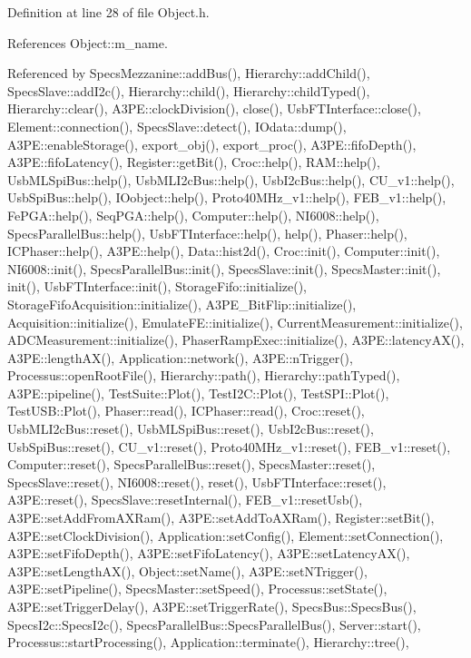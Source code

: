 Definition at line 28 of file Object.\+h.



References Object\+::m\+\_\+name.



Referenced by Specs\+Mezzanine\+::add\+Bus(), Hierarchy\+::add\+Child(), Specs\+Slave\+::add\+I2c(), Hierarchy\+::child(), Hierarchy\+::child\+Typed(), Hierarchy\+::clear(), A3\+P\+E\+::clock\+Division(), close(), Usb\+F\+T\+Interface\+::close(), Element\+::connection(), Specs\+Slave\+::detect(), I\+Odata\+::dump(), A3\+P\+E\+::enable\+Storage(), export\+\_\+obj(), export\+\_\+proc(), A3\+P\+E\+::fifo\+Depth(), A3\+P\+E\+::fifo\+Latency(), Register\+::get\+Bit(), Croc\+::help(), R\+A\+M\+::help(), Usb\+M\+L\+Spi\+Bus\+::help(), Usb\+M\+L\+I2c\+Bus\+::help(), Usb\+I2c\+Bus\+::help(), C\+U\+\_\+v1\+::help(), Usb\+Spi\+Bus\+::help(), I\+Oobject\+::help(), Proto40\+M\+Hz\+\_\+v1\+::help(), F\+E\+B\+\_\+v1\+::help(), Fe\+P\+G\+A\+::help(), Seq\+P\+G\+A\+::help(), Computer\+::help(), N\+I6008\+::help(), Specs\+Parallel\+Bus\+::help(), Usb\+F\+T\+Interface\+::help(), help(), Phaser\+::help(), I\+C\+Phaser\+::help(), A3\+P\+E\+::help(), Data\+::hist2d(), Croc\+::init(), Computer\+::init(), N\+I6008\+::init(), Specs\+Parallel\+Bus\+::init(), Specs\+Slave\+::init(), Specs\+Master\+::init(), init(), Usb\+F\+T\+Interface\+::init(), Storage\+Fifo\+::initialize(), Storage\+Fifo\+Acquisition\+::initialize(), A3\+P\+E\+\_\+\+Bit\+Flip\+::initialize(), Acquisition\+::initialize(), Emulate\+F\+E\+::initialize(), Current\+Measurement\+::initialize(), A\+D\+C\+Measurement\+::initialize(), Phaser\+Ramp\+Exec\+::initialize(), A3\+P\+E\+::latency\+A\+X(), A3\+P\+E\+::length\+A\+X(), Application\+::network(), A3\+P\+E\+::n\+Trigger(), Processus\+::open\+Root\+File(), Hierarchy\+::path(), Hierarchy\+::path\+Typed(), A3\+P\+E\+::pipeline(), Test\+Suite\+::\+Plot(), Test\+I2\+C\+::\+Plot(), Test\+S\+P\+I\+::\+Plot(), Test\+U\+S\+B\+::\+Plot(), Phaser\+::read(), I\+C\+Phaser\+::read(), Croc\+::reset(), Usb\+M\+L\+I2c\+Bus\+::reset(), Usb\+M\+L\+Spi\+Bus\+::reset(), Usb\+I2c\+Bus\+::reset(), Usb\+Spi\+Bus\+::reset(), C\+U\+\_\+v1\+::reset(), Proto40\+M\+Hz\+\_\+v1\+::reset(), F\+E\+B\+\_\+v1\+::reset(), Computer\+::reset(), Specs\+Parallel\+Bus\+::reset(), Specs\+Master\+::reset(), Specs\+Slave\+::reset(), N\+I6008\+::reset(), reset(), Usb\+F\+T\+Interface\+::reset(), A3\+P\+E\+::reset(), Specs\+Slave\+::reset\+Internal(), F\+E\+B\+\_\+v1\+::reset\+Usb(), A3\+P\+E\+::set\+Add\+From\+A\+X\+Ram(), A3\+P\+E\+::set\+Add\+To\+A\+X\+Ram(), Register\+::set\+Bit(), A3\+P\+E\+::set\+Clock\+Division(), Application\+::set\+Config(), Element\+::set\+Connection(), A3\+P\+E\+::set\+Fifo\+Depth(), A3\+P\+E\+::set\+Fifo\+Latency(), A3\+P\+E\+::set\+Latency\+A\+X(), A3\+P\+E\+::set\+Length\+A\+X(), Object\+::set\+Name(), A3\+P\+E\+::set\+N\+Trigger(), A3\+P\+E\+::set\+Pipeline(), Specs\+Master\+::set\+Speed(), Processus\+::set\+State(), A3\+P\+E\+::set\+Trigger\+Delay(), A3\+P\+E\+::set\+Trigger\+Rate(), Specs\+Bus\+::\+Specs\+Bus(), Specs\+I2c\+::\+Specs\+I2c(), Specs\+Parallel\+Bus\+::\+Specs\+Parallel\+Bus(), Server\+::start(), Processus\+::start\+Processing(), Application\+::terminate(), Hierarchy\+::tree(), 